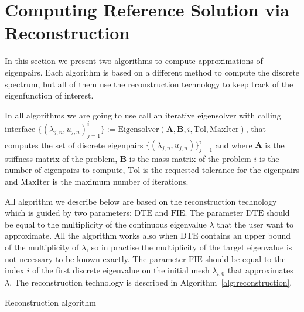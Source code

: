 \documentclass[preprint,12pt]{elsarticle}
\begin{document}
\section{Computing Reference Solution via Reconstruction}\label{sec:recoref}

In this section we present two algorithms to compute approximations of eigenpairs. Each algorithm is based on a different method to compute the discrete spectrum, but all of them use the reconstruction technology to keep track of the eigenfunction of interest.

In all algorithms we are going to use call an iterative eigensolver with calling interface
$\{(\lambda_{j,n},u_{j,n})_{j=1}^{i}\}:=\mathrm{Eigensolver}(\mathbf{A},\mathbf{B},i,\mathrm{Tol},\mathrm{MaxIter})$, that computes the set of discrete eigenpairs $\{(\lambda_{j,n},u_{j,n})\}_{j=1}^{i}$ and where $\mathbf{A}$ is the stiffness matrix of the problem, $\mathbf{B}$ is the mass matrix of the problem  $i$ is the number of eigenpairs to compute, $\mathrm{Tol}$ is the requested tolerance for the eigenpairs and $\mathrm{MaxIter}$ is the maximum number of iterations. 


All algorithm we describe below are based on the reconstruction technology which is guided by two parameters: $\mathrm{DTE}$ and $\mathrm{FIE}$. The parameter $\mathrm{DTE}$ should be equal to the multiplicity of the continuous eigenvalue $\lambda$ that the user want to approximate. All the algorithm works also when $\mathrm{DTE}$ contains an upper bound of the multiplicity of $\lambda$, so in practise the multiplicity of the target eigenvalue is not necessary to be known exactly. The parameter $\mathrm{FIE}$ should be equal to the index $i$ of the first discrete eigenvalue on the initial mesh $\lambda_{i,0}$ that approximates $\lambda$. The reconstruction technology is described in Algorithm~\eqref{alg:reconstruction}.

\begin{algorithm}[H] \caption{Reconstruction algorithm} \label{alg:reconstruction} 
\begin{algorithmic}




\end{algorithmic}
\end{algorithm}
\end{document}
